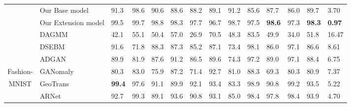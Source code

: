 \documentclass[journal]{IEEEtran}
\theoremstyle{remark}
\begin{document}
\begin{table*}[!htb]
\begin{minipage}[t]{0.95\textwidth}
\begin{tabular}{cx{3.0cm}x{0.6cm}x{0.6cm}x{0.6cm}x{0.6cm}x{0.6cm}x{0.6cm}x{0.6cm}x{0.6cm}x{0.6cm}x{0.6cm}x{0.6cm}x{0.8cm}}
        &Our Base model & 91.3 & 98.6 & 90.6 & 88.6 & 88.2 & 89.1 & 91.2 & 85.6 & 87.7 & 86.0 & 89.7 & 3.70\\
		& Our Extension model & 99.5 & 99.7 & 98.8 & 98.3 & 97.7 & 96.7 & 98.7 & 97.5 & \textbf{98.6} & 97.3 & \textbf{98.3} & \textbf{0.97}\\
		        \cmidrule(lr){1-14}
		& DAGMM~\cite{zhai2016deep} 
        & 42.1 & 55.1 & 50.4 & 57.0 & 26.9 & 70.5 & 48.3 & 83.5 & 49.9 & 34.0 & 51.8 & 16.47\\
		& DSEBM~\cite{zong2018deep} 
		& 91.6 & 71.8 & 88.3 & 87.3 & 85.2 & 87.1 & 73.4 & 98.1 & 86.0 & 97.1 & 86.6 & 8.61\\
		& ADGAN~\cite{deecke2018anomaly} 
		& 89.9 & 81.9 & 87.6 & 91.2 & 86.5 & 89.6 & 74.3 & 97.2 & 89.0 & 97.1 & 88.4 & 6.75\\
		Fashion- & GANomaly~\cite{Akcay2018} 
		& 80.3 & 83.0 & 75.9 & 87.2 & 71.4 & 92.7 & 81.0 & 88.3 & 69.3 & 80.3 & 80.9 & 7.37\\
		MNIST & GeoTrans~\cite{golan2018deep} 
		& \textbf{99.4} & 97.6 & 91.1 & 89.9 & 92.1 & 93.4 & 83.3 & 98.9 & 90.8 & 99.2 & 93.5 & 5.22\\
		& ARNet~\cite{fye2020ARNet} & 92.7 & 99.3 & 89.1 & 93.6 & 90.8 & 93.1 & 85.0 & 98.4 & 97.8 & 98.4 & 93.9 & 4.70\\
		\cmidrule(lr){2-2} \cmidrule(lr){3-3} \cmidrule(lr){4-4} \cmidrule(lr){5-5} \cmidrule(lr){6-6} \cmidrule(lr){7-7} \cmidrule(lr){8-8} \cmidrule(lr){9-9} \cmidrule(lr){10-10} \cmidrule(lr){11-11} \cmidrule(lr){12-12} \cmidrule(lr){13-13} \cmidrule(lr){14-14}
        

\end{tabular}
\end{minipage}
\end{table*}
\end{document}
